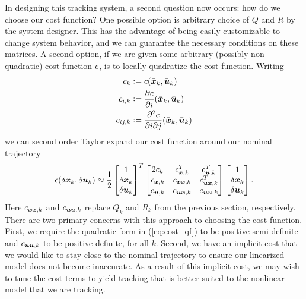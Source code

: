 In designing this tracking system, a second question now occurs: how do we choose our cost function? One possible option is arbitrary choice of $Q$ and $R$ by the system designer. This has the advantage of being easily customizable to change system behavior, and we can guarantee the necessary conditions on these matrices. A second option, if we are given some arbitrary (possibly non-quadratic) cost function $c$, is to locally quadratize the cost function. Writing 
\begin{align}
    \label{eq:cost_derivs}
    c_{k} &\vcentcolon= c(\bar{\bm{x}}_k,\bar{\bm{u}}_k)\\
    c_{i,k} &\vcentcolon= \frac{\partial c}{\partial i}(\bar{\bm{x}}_k,\bar{\bm{u}}_k)\\
    c_{ij,k} &\vcentcolon= \frac{\partial^2 c}{\partial i \partial j}(\bar{\bm{x}}_k,\bar{\bm{u}}_k)
\end{align}
we can second order Taylor expand our cost function around our nominal trajectory
\begin{equation}
    c(\delta \bm{x}_k, \delta \bm{u}_k) \approx 
\frac{1}{2}
    \begin{bmatrix}
    1\\
    \delta \bm{x}_k\\
    \delta \bm{u}_k
\end{bmatrix}^T
    \begin{bmatrix}
    2 c_k & c_{\bm{x},k}^T & c_{\bm{u},k}^T\\
    c_{\bm{x},k} & c_{\bm{x} \bm{x},k} & c_{\bm{u} \bm{x},k}^T\\
    c_{\bm{u},k} & c_{\bm{u} \bm{x},k} & c_{\bm{u} \bm{u},k}
\end{bmatrix}
    \begin{bmatrix}
    1\\
    \delta \bm{x}_k\\
    \delta \bm{u}_k
\end{bmatrix}.
\label{eq:cost_qf}
\end{equation}
Here $c_{\bm{x} \bm{x},k}$ and $c_{\bm{u} \bm{u},k}$ replace $Q_k$ and $R_k$ from the previous section, respectively. There are two primary concerns with this approach to choosing the cost function. First, we require the quadratic form in (\ref{eq:cost_qf}) to be positive semi-definite and $c_{\bm{u} \bm{u},k}$ to be positive definite, for all $k$. Second, we have an implicit cost that we would like to stay close to the nominal trajectory to ensure our linearized model does not become inaccurate. As a result of this implicit cost, we may wish to tune the cost terms to yield tracking that is better suited to the nonlinear model that we are tracking. 

